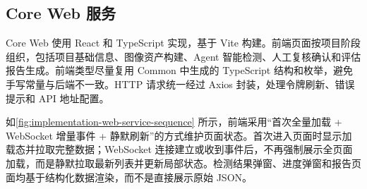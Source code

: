 \subsection{Core Web 服务}
\label{subsec:implementation-web-service}

Core Web 使用 React 和 TypeScript 实现，基于 Vite 构建。前端页面按项目阶段组织，包括项目基础信息、图像资产构建、Agent 智能检测、人工复核确认和评估报告生成。前端类型尽量复用 Common 中生成的 TypeScript 结构和枚举，避免手写常量与后端不一致。HTTP 请求统一经过 Axios 封装，处理令牌刷新、错误提示和 API 地址配置。

如\cref{fig:implementation-web-service-sequence} 所示，前端采用“首次全量加载 + WebSocket 增量事件 + 静默刷新”的方式维护页面状态。首次进入页面时显示加载态并拉取完整数据；WebSocket 连接建立或收到事件后，不再强制展示全页面加载，而是静默拉取最新列表并更新局部状态。检测结果弹窗、进度弹窗和报告页面均基于结构化数据渲染，而不是直接展示原始 JSON。

